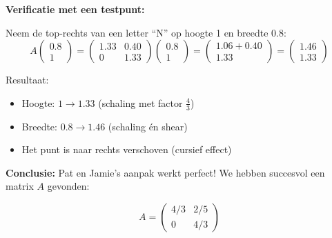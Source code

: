 \documentclass{ximera}
\begin{document}
\begin{freeResponse}
\textbf{Verificatie met een testpunt:}

Neem de top-rechts van een letter ``N'' op hoogte 1 en breedte 0.8:
$$A \begin{pmatrix} 0.8 \\ 1 \end{pmatrix} = \begin{pmatrix} 1.33 & 0.40 \\ 0 & 1.33 \end{pmatrix} \begin{pmatrix} 0.8 \\ 1 \end{pmatrix} = \begin{pmatrix} 1.06 + 0.40 \\ 1.33 \end{pmatrix} = \begin{pmatrix} 1.46 \\ 1.33 \end{pmatrix}$$

Resultaat:
\begin{itemize}
\item Hoogte: $1 \to 1.33$ (schaling met factor $\frac{4}{3}$)
\item Breedte: $0.8 \to 1.46$ (schaling én shear)
\item Het punt is naar rechts verschoven (cursief effect)
\end{itemize}

\textbf{Conclusie:} Pat en Jamie's aanpak werkt perfect! We hebben succesvol een matrix $A$ gevonden:

$$\boxed{A = \begin{pmatrix} 4/3 & 2/5 \\ 0 & 4/3 \end{pmatrix}}$$
\end{freeResponse}
\end{document}
